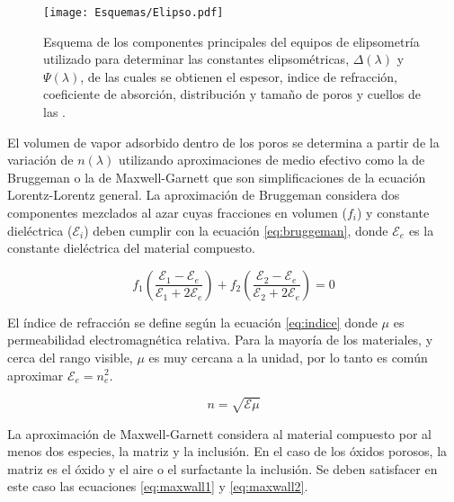 			  \begin{figure}[h]
				\begin{center}
				\texttt{[image: Esquemas/Elipso.pdf]}
			  	\caption[Esquema de la técncia de elipsoporosimetría ambiental]{Esquema de los componentes principales del equipos de elipsometría utilizado para determinar las constantes elipsométricas, $\Delta(\lambda)$ y $\Psi(\lambda)$, de las cuales se obtienen el espesor, indice de refracción, coeficiente de absorción, distribución y tamaño de poros y cuellos de las \pdm.}
			  	\label{fig:elipso}
			  	\end{center}
			  	\end{figure}
		
		El volumen de vapor adsorbido dentro de los poros se determina a partir de la variación de $n(\lambda)$ utilizando aproximaciones de medio efectivo como la de Bruggeman\cite{Bruggeman1935} o la de Maxwell-Garnett\cite{Garnett1906} que son simplificaciones de la ecuación Lorentz-Lorentz general\cite{TompkinsHarlandG.1999}.
		La aproximación de Bruggeman considera dos componentes mezclados al azar cuyas fracciones en volumen ($f_i$) y constante dieléctrica ($\mathcal{E}_i$) deben cumplir con la ecuación \ref{eq:bruggeman}, donde $\mathcal{E}_e$ es la constante dieléctrica del material compuesto. 
				
				\begin{equation}
				 f_1\left(\frac{\mathcal{E}_1-\mathcal{E}_e}{\mathcal{E}_1+2\mathcal{E}_e}\right)+
				 f_2\left(\frac{\mathcal{E}_2-\mathcal{E}_e}{\mathcal{E}_2+2\mathcal{E}_e}\right)=0
			     \label{eq:bruggeman}
				 \end{equation}
		
		El índice de refracción se define según la ecuación \ref{eq:indice} donde $\mu$ es permeabilidad electromagnética relativa. Para la mayoría de los materiales, y cerca del rango visible, $\mu$ es muy cercana a la unidad, por lo tanto es común aproximar $\mathcal{E}_e=n_e^2$.
		
						\begin{equation}
					 	   n=\sqrt{\mathcal{E}\mu}
					 	   \label{eq:indice}
						\end{equation}
		
		La aproximación de Maxwell-Garnett considera al material compuesto por al menos dos especies, la matriz y la inclusión. En el caso de los óxidos porosos, la matriz es el óxido y el aire o el surfactante la inclusión. Se deben satisfacer en este caso las ecuaciones \ref{eq:maxwall1} y \ref{eq:maxwall2}.
				
